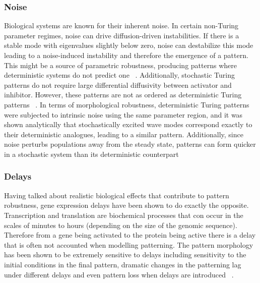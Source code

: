 \subsubsection{Noise}
Biological systems are known for their inherent noise.
In certain non-Turing parameter regimes, noise can drive diffusion-driven instabilities.
If there is a stable mode with eigenvalues slightly below zero, noise can destabilize this mode leading to a noise-induced instability and therefore the emergence of a pattern.
This might be a source of parametric robustness, producing patterns where deterministic systems do not predict one ~\parencite{Butler2009, Butler2011, Biancalani2010}.
Additionally, stochastic Turing patterns do not require large differential diffusivity between activator and inhibitor.
However, these patterns are not as ordered as deterministic Turing patterns ~\parencite{Karig2018}.
In terms of morphological robustness, deterministic Turing patterns were subjected to intrinsic noise using the same parameter region, and it was shown analytically that stochastically excited wave modes correspond exactly to their deterministic analogues, leading to a similar pattern.
Additionally, since noise perturbs populations away from the steady state, patterns can form quicker in a stochastic system than its deterministic counterpart ~\parencite{Maini2012}


\subsubsection{Delays} Having talked about realistic biological effects that contribute to pattern robustness, gene expression delays have been shown to do exactly the opposite.
Transcription and translation are biochemical processes that con occur in the scales of minutes to hours (depending on the size of the genomic sequence).
Therefore from a gene being activated to the protein being active there is a delay that is often not accounted when modelling patterning.
The pattern morphology has been shown to be extremely sensitive to delays including sensitivity to the initial conditions in the final pattern, dramatic changes in the patterning lag under different delays and even pattern loss when delays are introduced ~\parencite{Maini2012}.



